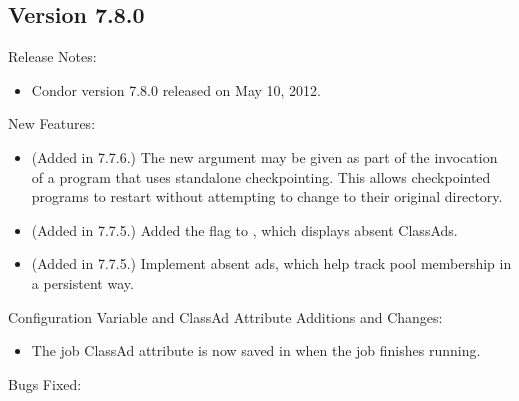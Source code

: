 \subsection*{\label{sec:New-7-8-0}Version 7.8.0}

\noindent Release Notes:

\begin{itemize}

\item Condor version 7.8.0 released on May 10, 2012.

\end{itemize}


\noindent New Features:

\begin{itemize}

\item (Added in 7.7.6.)  The new  argument
may be given as part of the invocation of a program that uses
standalone checkpointing.  This allows checkpointed programs to restart
without attempting to change to their original directory.

\item (Added in 7.7.5.) Added the  flag to ,
which displays absent ClassAds.

\item (Added in 7.7.5.) Implement absent ads, which help track pool membership
in a persistent way.

\end{itemize}

\noindent Configuration Variable and ClassAd Attribute Additions and Changes:

\begin{itemize}

\item The job ClassAd attribute  is now saved in
   when the job finishes running.

\end{itemize}

\noindent Bugs Fixed:

